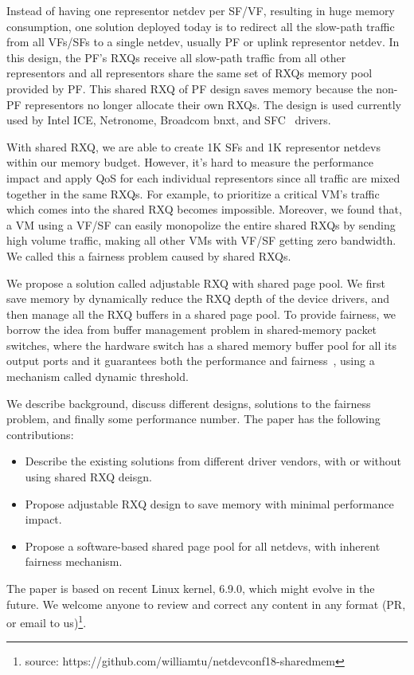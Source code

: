 \documentclass[letterpaper]{article}
\begin{document}
Instead of having one representor netdev per SF/VF, resulting in
huge memory consumption, one solution deployed today is to 
redirect all the slow-path traffic from all VFs/SFs to a single netdev,
usually PF or uplink representor netdev. In this design, the PF's RXQs receive
all slow-path traffic from all other representors and all representors
share the same set of RXQs memory pool provided by PF.
This shared RXQ of PF design saves memory because the non-PF representors
no longer allocate their own RXQs. The design is used currently used by Intel ICE,
Netronome, Broadcom bnxt, and SFC~\cite{survey} drivers.

With shared RXQ, we are able to create 1K SFs and 1K representor netdevs
within our memory budget. However, it's hard to measure the performance
impact and apply QoS for each individual representors since all traffic
are mixed together in the same RXQs. For example, to prioritize a critical
VM's traffic which comes into the shared RXQ becomes impossible.
Moreover, we found that, a VM using a VF/SF can easily monopolize the
entire shared RXQs by sending high volume traffic,
making all other VMs with VF/SF getting zero bandwidth.
We called this a fairness problem caused by shared RXQs.


We propose a solution called adjustable RXQ with shared page pool.
We first save memory by dynamically reduce the RXQ depth of the
device drivers, and then manage all the RXQ buffers in a shared
page pool. To provide fairness, we borrow the idea from buffer management
problem in shared-memory packet switches, where the hardware switch
has a shared memory buffer pool for all its output ports and it
guarantees both the performance and fairness~\cite{devlinksb, queuelength},
using a mechanism called dynamic threshold.

We describe background, discuss different designs, solutions to the fairness
problem, and finally some performance number. The paper has the following contributions:
\begin{itemize}
    \item Describe the existing solutions from different driver vendors,
          with or without using shared RXQ deisgn.
    \item Propose adjustable RXQ design to save memory with minimal performance impact.
    \item Propose a software-based shared page pool for all netdevs,
          with inherent fairness mechanism.
\end{itemize}
The paper is based on recent Linux kernel, 6.9.0, which might evolve in the future.
We welcome anyone to review and correct any content in any format (PR, or email to us)\footnote{source: https://github.com/williamtu/netdevconf18-sharedmem}.
\end{document}
